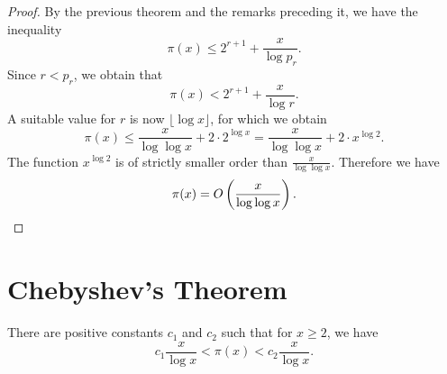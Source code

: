\begin{proof}
  By the previous theorem and the remarks preceding it, we have the inequality
  \begin{equation*}
    \pi(x)\leq 2^{r+1}+\frac{x}{\log p_r}.
  \end{equation*}
  Since $r<p_r$, we obtain that
  \begin{equation*}
    \pi(x)< 2^{r+1}+\frac{x}{\log r}.
  \end{equation*}
  A suitable value for $r$ is now $\lfloor\log x\rfloor$, for which we obtain
  \begin{equation*}
    \pi(x)\leq \frac{x}{\log\log x}+2\cdot 2^{\log x}=\frac{x}{\log\log x} + 2\cdot x^{\log 2}.
  \end{equation*}
  The function $x^{\log 2}$ is of strictly smaller order than $\frac{x}{\log\log x}$. Therefore we have
  \begin{equation*}
    \pi(x)=O\left(\frac{x}{\log\log x}\right).\qedhere
  \end{equation*}
\end{proof}

\section{Chebyshev's Theorem}

\begin{theorem}
  There are positive constants $c_1$ and $c_2$ such that for $x\geq 2$, we have
  \begin{equation*}
    c_1\frac{x}{\log x} < \pi(x) < c_2\frac{x}{\log x}.
  \end{equation*}
\end{theorem}

